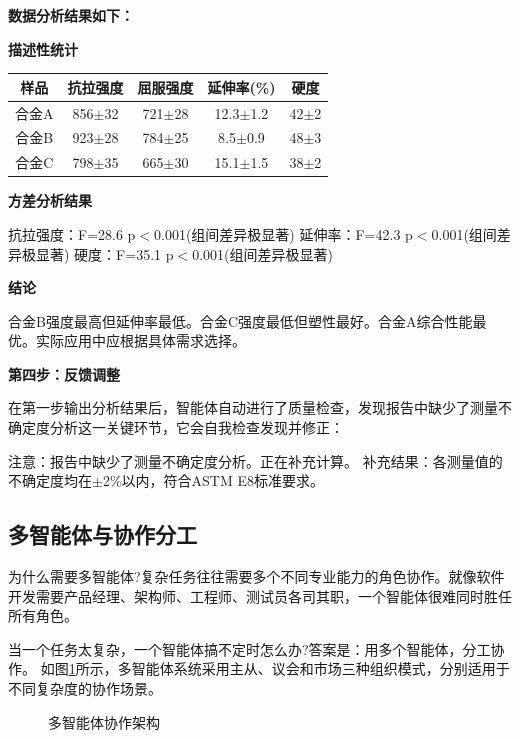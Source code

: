 \begin{aibox}
\textbf{数据分析结果如下：}

\textbf{描述性统计}

\begin{formalTable}[H]
\caption{合金样品力学性能描述性统计}
\label{tab:ch3_06_materials}
\begin{tabular}{c c c c c}
\toprule
样品 & 抗拉强度 & 屈服强度 & 延伸率(\%) & 硬度 \\ \midrule
合金A & 856$\pm$32 & 721$\pm$28 & 12.3$\pm$1.2 & 42$\pm$2 \\
合金B & 923$\pm$28 & 784$\pm$25 & 8.5$\pm$0.9 & 48$\pm$3 \\
合金C & 798$\pm$35 & 665$\pm$30 & 15.1$\pm$1.5 & 38$\pm$2 \\ \bottomrule
\end{tabular}
\end{formalTable}

\textbf{方差分析结果}

抗拉强度：F=28.6 p$<$0.001(组间差异极显著)
延伸率：F=42.3 p$<$0.001(组间差异极显著)
硬度：F=35.1 p$<$0.001(组间差异极显著)

\textbf{结论}

合金B强度最高但延伸率最低。合金C强度最低但塑性最好。合金A综合性能最优。实际应用中应根据具体需求选择。
\end{aibox}

\textbf{第四步：反馈调整 }

 在第一步输出分析结果后，智能体自动进行了质量检查，发现报告中缺少了测量不确定度分析这一关键环节，它会自我检查发现并修正：

\begin{aibox}
注意：报告中缺少了测量不确定度分析。正在补充计算。
补充结果：各测量值的不确定度均在$\pm$2\%以内，符合ASTM E8标准要求。
\end{aibox}

\subsection{多智能体与协作分工}

为什么需要多智能体?复杂任务往往需要多个不同专业能力的角色协作。就像软件开发需要产品经理、架构师、工程师、测试员各司其职，一个智能体很难同时胜任所有角色。

当一个任务太复杂，一个智能体搞不定时怎么办?答案是：用多个智能体，分工协作。 如图\ref{fig:ch3_3_28}所示，多智能体系统采用主从、议会和市场三种组织模式，分别适用于不同复杂度的协作场景。

\begin{figure}[H]
\centering
{}
\caption{多智能体协作架构}
\label{fig:ch3_3_28}
\end{figure}

